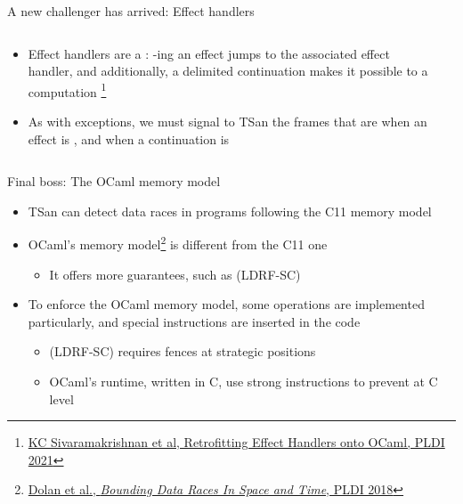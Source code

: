 \begin{frame}{A new challenger has arrived: Effect handlers}
  \begin{columns}
    \begin{column}{0.5\textwidth}
      \begin{itemize}
        \item Effect handlers are a : -ing an effect jumps to the associated effect handler, and additionally, a delimited continuation makes it possible to  a computation
          \footnote[frame]{\href{https://arxiv.org/pdf/2104.00250.pdf}{KC Sivaramakrishnan et al, Retrofitting Effect Handlers onto OCaml, PLDI 2021}}
        \item As with exceptions, we must signal to TSan the frames that are  when an effect is , and  when a continuation is 
      \end{itemize}
    \end{column}
    \begin{column}{0.5\textwidth}
    \end{column}
  \end{columns}
\end{frame}


\begin{frame}{Final boss: The OCaml memory model}
  \begin{itemize}
    \item TSan can detect data races in programs following the C11 memory model
    \item OCaml's memory model\footnote[frame]{\href{https://kcsrk.info/papers/pldi18-memory.pdf}{Dolan et al., \emph{Bounding Data Races In Space and Time}, PLDI 2018}} is different from the C11 one
      \begin{itemize}
        \item It offers more guarantees, such as  (LDRF-SC)
      \end{itemize}
    \item To enforce the OCaml memory model, some operations are implemented particularly, and special instructions are inserted in the code
      \begin{itemize}
        \item {} (LDRF-SC) requires fences at strategic positions
        \item OCaml's runtime, written in C, use strong instructions to prevent  at C level
      \end{itemize}
  \end{itemize}
\end{frame}

